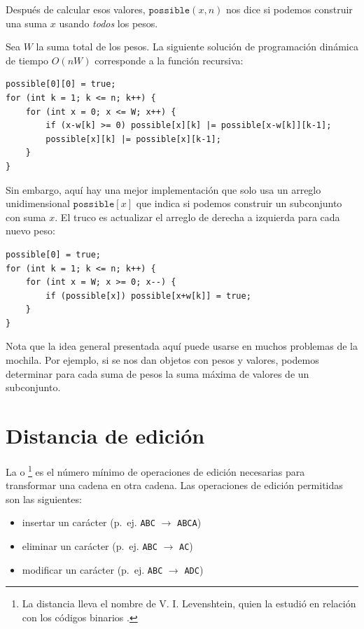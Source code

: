 Después de calcular esos valores, $\texttt{possible}(x,n)$
nos dice si podemos construir una
suma $x$ usando \emph{todos} los pesos.

Sea $W$ la suma total de los pesos.
La siguiente solución de programación dinámica
de tiempo $O(nW)$
corresponde a la función recursiva:
\begin{lstlisting}
possible[0][0] = true;
for (int k = 1; k <= n; k++) {
    for (int x = 0; x <= W; x++) {
        if (x-w[k] >= 0) possible[x][k] |= possible[x-w[k]][k-1];
        possible[x][k] |= possible[x][k-1];
    }
}
\end{lstlisting}

Sin embargo, aquí hay una mejor implementación que solo usa
un arreglo unidimensional $\texttt{possible}[x]$
que indica si podemos construir un subconjunto con suma $x$.
El truco es actualizar el arreglo de derecha a izquierda para
cada nuevo peso:
\begin{lstlisting}
possible[0] = true;
for (int k = 1; k <= n; k++) {
    for (int x = W; x >= 0; x--) {
        if (possible[x]) possible[x+w[k]] = true;
    }
}
\end{lstlisting}

Nota que la idea general presentada aquí puede usarse
en muchos problemas de la mochila.
Por ejemplo, si se nos dan objetos con pesos y valores,
podemos determinar para cada suma de pesos la suma máxima
de valores de un subconjunto.

\section{Distancia de edición}


La  o \footnote{La distancia
lleva el nombre de V. I. Levenshtein, quien la estudió en relación con los códigos binarios \cite{lev66}.}
es el número mínimo de operaciones de edición
necesarias para transformar una cadena
en otra cadena.
Las operaciones de edición permitidas son las siguientes:
\begin{itemize}
\item insertar un carácter (p.\ ej. \texttt{ABC} $\rightarrow$ \texttt{ABCA})
\item eliminar un carácter (p.\ ej. \texttt{ABC} $\rightarrow$ \texttt{AC})
\item modificar un carácter (p.\ ej. \texttt{ABC} $\rightarrow$ \texttt{ADC})
\end{itemize}

